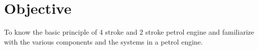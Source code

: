 \documentclass[12pt]{article}
\begin{document}
\section*{Objective}

\begin{itemize*}
    \item To know the basic principle of 4 stroke and 2 stroke petrol engine and familiarize with the various components and the systems in a petrol engine.
\end{itemize*}
\end{document}
